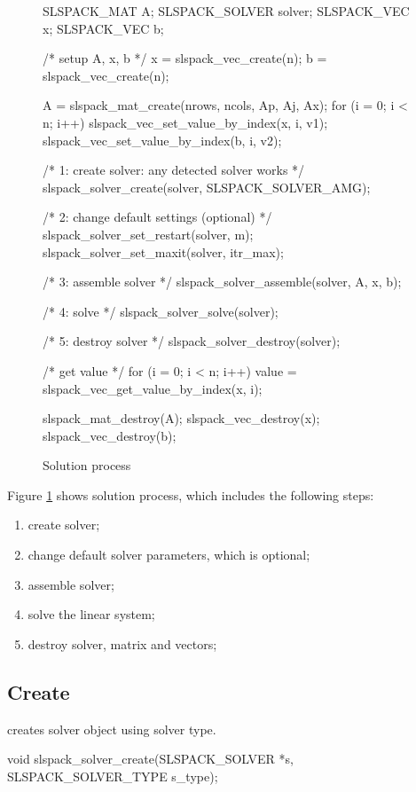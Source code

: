 \begin{figure}[!htb]
\begin{evb}
{
    SLSPACK_MAT A;
    SLSPACK_SOLVER solver;
    SLSPACK_VEC x;
    SLSPACK_VEC b;

    /* setup A, x, b */
    x = slspack_vec_create(n);
    b = slspack_vec_create(n);

    A = slspack_mat_create(nrows, ncols, Ap, Aj, Ax);
    for (i = 0; i < n; i++) {
        slspack_vec_set_value_by_index(x, i, v1);
        slspack_vec_set_value_by_index(b, i, v2);
    }

    /* 1: create solver: any detected solver works */
    slspack_solver_create(solver, SLSPACK_SOLVER_AMG);

    /* 2: change default settings (optional) */
    slspack_solver_set_restart(solver, m);
    slspack_solver_set_maxit(solver, itr_max);

    /* 3: assemble solver */
    slspack_solver_assemble(solver, A, x, b);

    /* 4: solve */
    slspack_solver_solve(solver);

    /* 5: destroy solver */
    slspack_solver_destroy(solver);

    /* get value */
    for (i = 0; i < n; i++) {
        value = slspack_vec_get_value_by_index(x, i);
    }

    slspack_mat_destroy(A);
    slspack_vec_destroy(x);
    slspack_vec_destroy(b);
}
\end{evb}
    \caption{Solution process}
    \label{solution-proc}
\end{figure}

Figure \ref{solution-proc} shows solution process, which includes the following steps:
\begin{enumerate}
    \item create solver;
    \item change default solver parameters, which is optional;
    \item assemble solver;
    \item solve the linear system;
    \item destroy solver, matrix and vectors;
\end{enumerate}

\subsection{Create}
 creates solver object using solver type.
\begin{evb}
void slspack_solver_create(SLSPACK_SOLVER *s, SLSPACK_SOLVER_TYPE s_type);
\end{evb}

